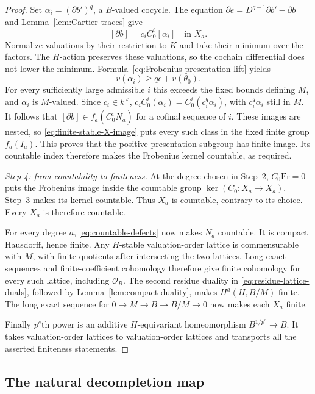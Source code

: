\begin{proof}
Set $\alpha_i=(\partial b')^q$, a $B$-valued cocycle.
The equation $\partial e=D^{q-1}\partial b'-\partial b$ and
Lemma~\ref{lem:Cartier-traces} give
\begin{equation}
 \label{eq:Frobenius-kernel-Cartier}
 [\partial b]=c_i C_0^i[\alpha_i]\quad\text{in }X_a.
\end{equation}
Normalize valuations by their restriction to $K$ and take their
minimum over the factors.  The $H$-action preserves these
valuations, so the cochain differential does not lower the
minimum.  Formula~\eqref{eq:Frobenius-presentation-lift} yields
\[
 v(\alpha_i)\ge q\epsilon+v(\theta_0).
\]
For every sufficiently large admissible $i$ this exceeds the
fixed bounds defining $M$, and $\alpha_i$ is $M$-valued.
Since $c_i\in k^\times$,
$c_iC_0^i(\alpha_i)=C_0^i(c_i^q\alpha_i)$, with
$c_i^q\alpha_i$ still in $M$.
It follows that $[\partial b]\in f_a(C_0^iN_a)$ for a
cofinal sequence of $i$.  These images are nested, so
\eqref{eq:finite-stable-X-image} puts every such class in the
fixed finite group $f_a(I_a)$.  This proves that the positive
presentation subgroup has finite image.  Its countable index
therefore makes the Frobenius kernel countable, as required.

\smallskip\noindent\emph{Step 4: from countability to finiteness.}
At the degree chosen in Step~2, $C_0\mathrm{Fr}=0$ puts the
Frobenius image inside the countable group
$\ker(C_0:X_a\to X_a)$.  Step~3 makes its kernel countable.
Thus $X_a$ is countable, contrary to its choice.  Every $X_a$
is therefore countable.

For every degree $a$, \eqref{eq:countable-defects} now makes
$N_a$ countable.
It is compact Hausdorff, hence finite.  Any $H$-stable
valuation-order lattice is commensurable with $M$, with
finite quotients after intersecting the two lattices.
Long exact sequences and finite-coefficient cohomology
therefore give finite cohomology for every such lattice,
including $\mathcal O_B$.
The second residue duality in
\eqref{eq:residue-lattice-duals}, followed by
Lemma~\ref{lem:compact-duality}, makes
$H^a(H,B/M)$ finite.  The long exact sequence for
$0\to M\to B\to B/M\to0$ now makes each $X_a$ finite.

Finally $p^e$th power is an additive $H$-equivariant
homeomorphism $B^{1/p^e}\to B$.  It takes valuation-order
lattices to valuation-order lattices and transports all
the asserted finiteness statements.
\end{proof}

\subsection{The natural decompletion map}

